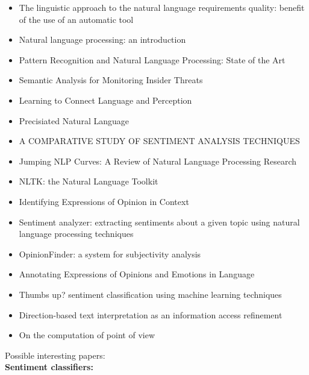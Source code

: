 \documentclass[9pt]{article}
\begin{document}
\begin{itemize}
\item The linguistic approach to the natural language requirements quality: benefit of the use of an automatic tool \cite{nlp methodology}
\item Natural language processing: an introduction \cite{advanced tuto}
\item Pattern Recognition and Natural Language Processing: State of the Art \cite{nlp sota}
\item Semantic Analysis for Monitoring Insider Threats \cite{inside threats}
\item Learning to Connect Language and Perception \cite{language and perception}
\item Precisiated Natural Language \cite{pnl}
\item A COMPARATIVE STUDY OF SENTIMENT ANALYSIS TECHNIQUES \cite{sentiment analysis}
\item Jumping NLP Curves: A Review of Natural Language Processing Research \cite{review nlp}
\item NLTK: the Natural Language Toolkit \cite{nltk}
\item Identifying Expressions of Opinion in Context \cite{opinion}
\item Sentiment analyzer: extracting sentiments about a given topic using natural language processing techniques \cite{sentiment analyzer}
\item OpinionFinder: a system for subjectivity analysis \cite{opinion finder}
\item Annotating Expressions of Opinions and Emotions in Language \cite{expressions opinion}
\item Thumbs  up?  sentiment classification using machine learning techniques \cite{thumbs}
\item Direction-based text interpretation as an information access refinement \cite{direction}
\item On the computation of point of view \cite{computation}
\
\end{itemize}


Possible interesting papers: \\
\textbf{Sentiment classifiers:} \\
\end{document}
